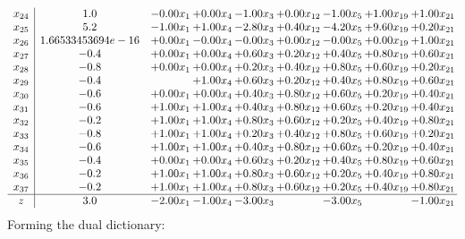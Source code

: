 \documentclass[8pt]{article}
\begin{document}
\[\begin{array}{c| c c@{\hskip 2pt} c@{\hskip 2pt} c@{\hskip 2pt} c@{\hskip 2pt} c@{\hskip 2pt} c@{\hskip 2pt} c@{\hskip 2pt} }
 x_{24}   &  1.0 & -0.00 x_{1} & +  0.00 x_{4} & -1.00 x_{3} & +  0.00 x_{12} & -1.00 x_{5} & +  1.00 x_{19} & +  1.00 x_{21}\\
 x_{25}   &  5.2 & -1.00 x_{1} & +  1.00 x_{4} & -2.80 x_{3} & +  0.40 x_{12} & -4.20 x_{5} & +  9.60 x_{19} & +  0.20 x_{21}\\
 x_{26}   &  1.66533453694e-16 & +  0.00 x_{1} & -0.00 x_{4} & -0.00 x_{3} & +  0.00 x_{12} & -0.00 x_{5} & +  0.00 x_{19} & +  1.00 x_{21}\\
 x_{27}   &  -0.4 & +  0.00 x_{1} & +  0.00 x_{4} & +  0.60 x_{3} & +  0.20 x_{12} & +  0.40 x_{5} & +  0.80 x_{19} & +  0.60 x_{21}\\
 x_{28}   &  -0.8 & +  0.00 x_{1} & +  0.00 x_{4} & +  0.20 x_{3} & +  0.40 x_{12} & +  0.80 x_{5} & +  0.60 x_{19} & +  0.20 x_{21}\\
 x_{29}   &  -0.4  &   & +  1.00 x_{4} & +  0.60 x_{3} & +  0.20 x_{12} & +  0.40 x_{5} & +  0.80 x_{19} & +  0.60 x_{21}\\
 x_{30}   &  -0.6 & +  0.00 x_{1} & +  0.00 x_{4} & +  0.40 x_{3} & +  0.80 x_{12} & +  0.60 x_{5} & +  0.20 x_{19} & +  0.40 x_{21}\\
 x_{31}   &  -0.6 & +  1.00 x_{1} & +  1.00 x_{4} & +  0.40 x_{3} & +  0.80 x_{12} & +  0.60 x_{5} & +  0.20 x_{19} & +  0.40 x_{21}\\
 x_{32}   &  -0.2 & +  1.00 x_{1} & +  1.00 x_{4} & +  0.80 x_{3} & +  0.60 x_{12} & +  0.20 x_{5} & +  0.40 x_{19} & +  0.80 x_{21}\\
 x_{33}   &  -0.8 & +  1.00 x_{1} & +  1.00 x_{4} & +  0.20 x_{3} & +  0.40 x_{12} & +  0.80 x_{5} & +  0.60 x_{19} & +  0.20 x_{21}\\
 x_{34}   &  -0.6 & +  1.00 x_{1} & +  1.00 x_{4} & +  0.40 x_{3} & +  0.80 x_{12} & +  0.60 x_{5} & +  0.20 x_{19} & +  0.40 x_{21}\\
 x_{35}   &  -0.4 & +  0.00 x_{1} & +  0.00 x_{4} & +  0.60 x_{3} & +  0.20 x_{12} & +  0.40 x_{5} & +  0.80 x_{19} & +  0.60 x_{21}\\
 x_{36}   &  -0.2 & +  1.00 x_{1} & +  1.00 x_{4} & +  0.80 x_{3} & +  0.60 x_{12} & +  0.20 x_{5} & +  0.40 x_{19} & +  0.80 x_{21}\\
 x_{37}   &  -0.2 & +  1.00 x_{1} & +  1.00 x_{4} & +  0.80 x_{3} & +  0.60 x_{12} & +  0.20 x_{5} & +  0.40 x_{19} & +  0.80 x_{21}\\
\hline
z    &  3.0 & -2.00 x_{1} & -1.00 x_{4} & -3.00 x_{3} &   & -3.00 x_{5} &   & -1.00 x_{21}\\
\end{array}\]
Forming the dual dictionary:
\end{document}
